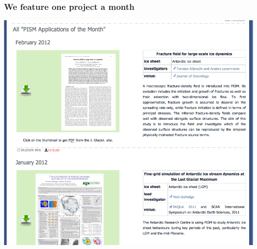 \documentclass[hide notes,intlimits]{beamer}
\begin{document}
\begin{frame}
  \frametitle{We feature one project a month}
  \begin{center}
    \includegraphics[height=0.75\textheight]{application-of-the-month.png}
  \end{center}
\end{frame}
\end{document}

